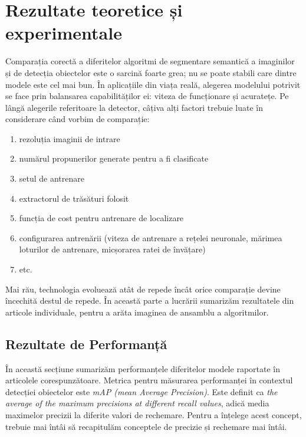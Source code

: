 \chapter{Rezultate teoretice și experimentale}
\label{cap:rezultate}
Comparația corectă a diferitelor algoritmi de segmentare semantică a imaginilor și de detecția obiectelor este o sarcină foarte grea; nu se poate stabili care dintre modele este cel mai bun. În aplicațiile din viața reală, alegerea modelului potrivit se face prin balansarea capabilităților ei: viteza de funcționare și acuratețe. Pe lângă alegerile referitoare la detector, câțiva alți factori trebuie luate în considerare când vorbim de comparație:

\begin{enumerate}
	\item rezoluția imaginii de intrare
	\item numărul propunerilor generate pentru a fi clasificate
	\item setul de antrenare
	\item extractorul de trăsături folosit
	\item funcția de cost pentru antrenare de localizare
	\item configurarea antrenării (viteza de antrenare a rețelei neuronale, mărimea loturilor de antrenare, micșorarea ratei de învățare)
	\item etc.
\end{enumerate}

Mai rău, technologia evoluează atât de repede încât orice comparație devine încechită destul de repede.\newline
În această parte a lucrării sumarizăm rezultatele din articole individuale, pentru a arăta imaginea de ansamblu a algoritmilor.

\section{Rezultate de Performanță}
În această secțiune sumarizăm performanțele diferitelor modele raportate în articolele corespunzătoare.\newline
Metrica pentru măsurarea performanței în contextul detecției obiectelor este \textit{mAP (mean Average Precision)}. Este definit ca \textit{the average of the maximum precisions at different recall values}, adică media maximelor precizii la diferite valori de rechemare. Pentru a înțelege acest concept, trebuie mai întâi să recapitulăm conceptele de precizie și rechemare mai întâi.
